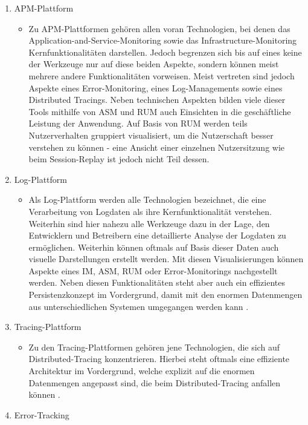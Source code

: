 \begin{enumerate}
	\item APM-Plattform
	\begin{itemize}
		\item Zu APM-Plattformen gehören allen voran Technologien, bei denen das Application-and-Service-Monitoring sowie das Infrastructure-Monitoring Kernfunktionalitäten darstellen. Jedoch begrenzen sich bis auf eines keine der Werkzeuge nur auf diese beiden Aspekte, sondern können meist mehrere andere Funktionalitäten vorweisen. Meist vertreten sind jedoch Aspekte eines Error-Monitoring, eines Log-Managements sowie eines Distributed Tracings. Neben technischen Aspekten bilden viele dieser Tools mithilfe von ASM und RUM auch Einsichten in die geschäftliche Leistung der Anwendung. Auf Basis von RUM werden teils Nutzerverhalten gruppiert visualisiert, um die Nutzerschaft besser verstehen zu können - eine Ansicht einer einzelnen Nutzersitzung wie beim Session-Replay ist jedoch nicht Teil dessen.
	\end{itemize}
	\item Log-Plattform
	\begin{itemize}
		\item Als Log-Plattform werden alle Technologien bezeichnet, die eine Verarbeitung von Logdaten als ihre Kernfunktionalität verstehen. Weiterhin sind hier nahezu alle Werkzeuge dazu in der Lage, den Entwicklern und Betreibern eine detaillierte Analyse der Logdaten zu ermöglichen. Weiterhin können oftmals auf Basis dieser Daten auch visuelle Darstellungen erstellt werden. Mit diesen Visualisierungen können Aspekte eines IM, ASM, RUM oder Error-Monitorings nachgestellt werden. Neben diesen Funktionalitäten steht aber auch ein effizientes Persistenzkonzept im Vordergrund, damit mit den enormen Datenmengen aus unterschiedlichen Systemen umgegangen werden kann \cite{TowardsAutomatedLogParsingForLargeScale}.
	\end{itemize}
	\item Tracing-Plattform
	\begin{itemize}
		\item Zu den Tracing-Plattformen gehören jene Technologien, die sich auf Distributed-Tracing konzentrieren. Hierbei steht oftmals eine effiziente Architektur im Vordergrund, welche explizit auf die enormen Datenmengen angepasst sind, die beim Distributed-Tracing anfallen können \cite{DapperInfrastructure}.
	\end{itemize}
	\item Error-Tracking
	\begin{itemize}

\end{itemize}
\end{enumerate}
